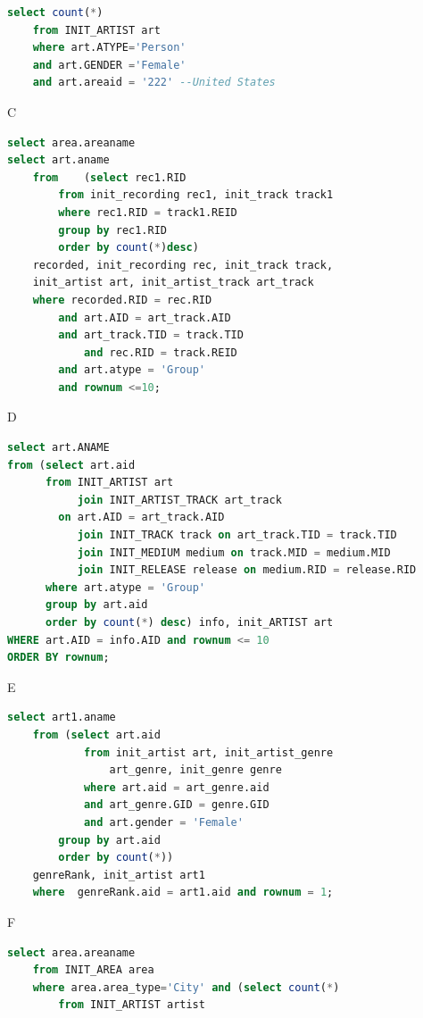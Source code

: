 \documentclass[11pt]{article} %
\begin{document}
{\begin{lstlisting}[language=SQL, keywordstyle=\color{blue!70},
commentstyle=\color{red!50!green!50!blue!50},
rulesepcolor=\color{red!20!green!20!blue!20},
frame=shadowbox]
select count(*)
	from INIT_ARTIST art
	where art.ATYPE='Person'
	and art.GENDER ='Female'
	and art.areaid = '222' --United States
\end{lstlisting}
C
\begin{lstlisting}[language=SQL, keywordstyle=\color{blue!70},
commentstyle=\color{red!50!green!50!blue!50},
rulesepcolor=\color{red!20!green!20!blue!20},
frame=shadowbox]
select area.areaname
select art.aname
	from	(select rec1.RID
		from init_recording rec1, init_track track1
		where rec1.RID = track1.REID 
		group by rec1.RID
		order by count(*)desc)
	recorded, init_recording rec, init_track track,
	init_artist art, init_artist_track art_track
	where recorded.RID = rec.RID
		and art.AID = art_track.AID
		and art_track.TID = track.TID 
      		and rec.RID = track.REID
		and art.atype = 'Group'
		and rownum <=10;
\end{lstlisting}
D
\begin{lstlisting}[language=SQL, keywordstyle=\color{blue!70},
commentstyle=\color{red!50!green!50!blue!50},
rulesepcolor=\color{red!20!green!20!blue!20},
frame=shadowbox]
select art.ANAME
from (select art.aid
      from INIT_ARTIST art 
           join INIT_ARTIST_TRACK art_track
		on art.AID = art_track.AID
           join INIT_TRACK track on art_track.TID = track.TID
           join INIT_MEDIUM medium on track.MID = medium.MID
           join INIT_RELEASE release on medium.RID = release.RID
      where art.atype = 'Group'
      group by art.aid
      order by count(*) desc) info, init_ARTIST art
WHERE art.AID = info.AID and rownum <= 10
ORDER BY rownum;
\end{lstlisting}
E
\begin{lstlisting}[language=SQL, keywordstyle=\color{blue!70},
commentstyle=\color{red!50!green!50!blue!50},
rulesepcolor=\color{red!20!green!20!blue!20},
frame=shadowbox]
select art1.aname
	from (select art.aid
			from init_artist art, init_artist_genre
				art_genre, init_genre genre
			where art.aid = art_genre.aid
			and art_genre.GID = genre.GID
			and art.gender = 'Female' 
		group by art.aid
		order by count(*))
	genreRank, init_artist art1
	where  genreRank.aid = art1.aid and rownum = 1;
\end{lstlisting}
F
\begin{lstlisting}[language=SQL, keywordstyle=\color{blue!70},
commentstyle=\color{red!50!green!50!blue!50},
rulesepcolor=\color{red!20!green!20!blue!20},
frame=shadowbox]
select area.areaname
	from INIT_AREA area
	where area.area_type='City' and (select count(*)
		from INIT_ARTIST artist

\end{lstlisting}}
\end{document}
